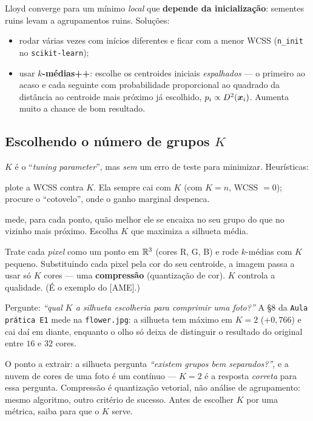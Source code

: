 \documentclass[11pt,a4paper]{article}
\begin{document}
\begin{atencao}
Lloyd converge para um mínimo \emph{local} que \textbf{depende da inicialização}:
sementes ruins levam a agrupamentos ruins. Soluções:
\begin{itemize}[leftmargin=1.2cm,nosep]
  \item rodar várias vezes com inícios diferentes e ficar com a menor WCSS
        (\texttt{n\_init} no \texttt{scikit-learn});
  \item usar \textbf{$k$-médias++}: escolhe os centroides iniciais
        \emph{espalhados} --- o primeiro ao acaso e cada seguinte com probabilidade
        proporcional ao quadrado da distância ao centroide mais próximo já
        escolhido, $p_i\propto D^2(\bm{x}_i)$. Aumenta muito a chance de bom resultado.
\end{itemize}
\end{atencao}

\subsection{Escolhendo o número de grupos $K$}
$K$ é o ``\emph{tuning parameter}'', mas \emph{sem} um erro de teste para
minimizar. Heurísticas:
\begin{description}[leftmargin=2.4cm,style=nextline]
  \item[Cotovelo] plote a WCSS contra $K$. Ela sempre cai com $K$ (com $K=n$,
        WCSS $=0$); procure o ``cotovelo'', onde o ganho marginal despenca.
  \item[Silhueta] mede, para cada ponto, quão melhor ele se encaixa no seu grupo do
        que no vizinho mais próximo. Escolha $K$ que maximiza a silhueta média.
\end{description}

\begin{exemplo}
Trate cada \emph{pixel} como um ponto em $\mathbb{R}^3$ (cores R, G, B) e rode $k$-médias
com $K$ pequeno. Substituindo cada pixel pela cor do seu centroide, a imagem passa a
usar só $K$ cores --- uma \textbf{compressão} (quantização de cor). $K$ controla a
qualidade. (É o exemplo do [AME].)
\end{exemplo}

\begin{emsala}
Pergunte: \emph{``qual $K$ a silhueta escolheria para comprimir uma foto?''} A §8 da
\texttt{Aula prática E1} mede na \texttt{flower.jpg}: a silhueta tem máximo em
$K=2$ ($+0{,}766$) e cai daí em diante, enquanto o olho só deixa de distinguir o
resultado do original entre $16$ e $32$ cores.

O ponto a extrair: a silhueta pergunta \emph{``existem grupos bem separados?''}, e a
nuvem de cores de uma foto é um contínuo --- $K=2$ é a resposta \emph{correta} para
essa pergunta. Compressão é quantização vetorial, não análise de agrupamento: mesmo
algoritmo, outro critério de sucesso. Antes de escolher $K$ por uma métrica, saiba
para que o $K$ serve.
\end{emsala}
\end{document}
